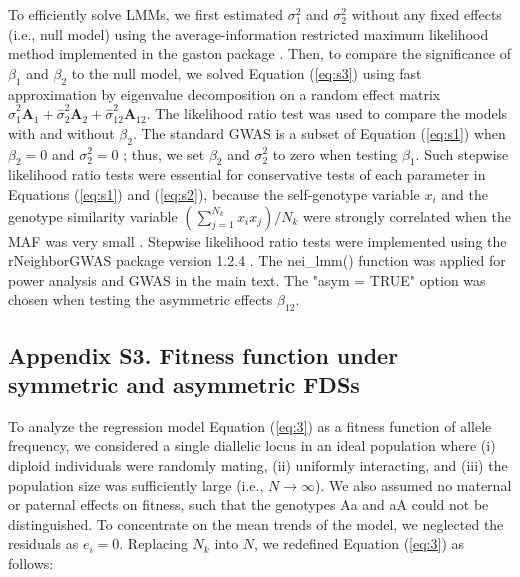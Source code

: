 \documentclass[12pt,]{article}
\begin{document}
To efficiently solve LMMs, we first estimated $\sigma^2_1$ and $\sigma^2_2$ without any fixed effects (i.e., null model) using the average-information restricted maximum likelihood method implemented in the gaston package \citep{R_gaston}. Then, to compare the significance of $\beta_1$ and $\beta_2$ to the null model, we solved Equation (\ref{eq:s3}) using fast approximation by eigenvalue decomposition on a random effect matrix $\hat{\sigma}^2_1\mathbf{A}_1+\hat{\sigma}^2_2\mathbf{A}_2+\hat{\sigma}^2_{12}\mathbf{A}_{12}$. The likelihood ratio test was used to compare the models with and without $\beta_2$. The standard GWAS is a subset of Equation (\ref{eq:s1}) when $\beta_2=0$ and $\sigma^2_2=0$ \citep{sato2019neighbor}; thus, we set $\beta_2$ and $\sigma^2_2$ to zero when testing $\beta_1$. Such stepwise likelihood ratio tests were essential for conservative tests of each parameter in Equations (\ref{eq:s1}) and (\ref{eq:s2}), because the self-genotype variable $x_i$ and the genotype similarity variable $(\sum^{N_{k}}_{j=1}{x_ix_j})/N_k$ were strongly correlated when the MAF was very small \citep{sato2019neighbor}. Stepwise likelihood ratio tests were implemented using the rNeighborGWAS package version 1.2.4 \citep{sato2019neighbor}. The nei\_lmm() function was applied for power analysis and GWAS in the main text. The "asym = TRUE" option was chosen when testing the asymmetric effects $\beta_{12}$.


\medskip
\subsection*{Appendix S3. Fitness function under symmetric and asymmetric FDSs}
To analyze the regression model Equation (\ref{eq:3}) as a fitness function of allele frequency, we considered a single diallelic locus in an ideal population where (i) diploid individuals were randomly mating, (ii) uniformly interacting, and (iii) the population size was sufficiently large (i.e., $N \to \infty$). We also assumed no maternal or paternal effects on fitness, such that the genotypes Aa and aA could not be distinguished. To concentrate on the mean trends of the model, we neglected the residuals as $e_i = 0$. Replacing $N_{k}$ into $N$, we redefined Equation (\ref{eq:3}) as follows:
\end{document}
